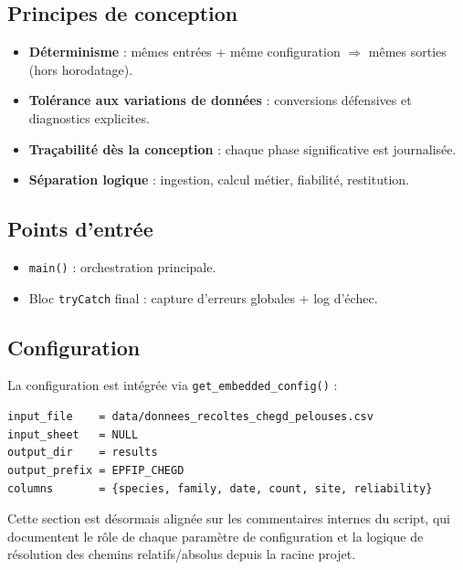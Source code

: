 \documentclass[11pt,a4paper]{article}
\begin{document}
\subsection{Principes de conception}
\begin{itemize}[leftmargin=1.2cm]
  \item \textbf{Déterminisme} : mêmes entrées + même configuration $\Rightarrow$ mêmes sorties (hors horodatage).
  \item \textbf{Tolérance aux variations de données} : conversions défensives et diagnostics explicites.
  \item \textbf{Traçabilité dès la conception} : chaque phase significative est journalisée.
  \item \textbf{Séparation logique} : ingestion, calcul métier, fiabilité, restitution.
\end{itemize}

\subsection{Points d'entrée}
\begin{itemize}[leftmargin=1.2cm]
  \item \texttt{main()} : orchestration principale.
  \item Bloc \texttt{tryCatch} final : capture d'erreurs globales + log d'échec.
\end{itemize}

\subsection{Configuration}
La configuration est intégrée via \texttt{get\_embedded\_config()} :
\begin{lstlisting}
input_file    = data/donnees_recoltes_chegd_pelouses.csv
input_sheet   = NULL
output_dir    = results
output_prefix = EPFIP_CHEGD
columns       = {species, family, date, count, site, reliability}
\end{lstlisting}

Cette section est désormais alignée sur les commentaires internes du script,
qui documentent le rôle de chaque paramètre de configuration et la logique de
résolution des chemins relatifs/absolus depuis la racine projet.
\end{document}
